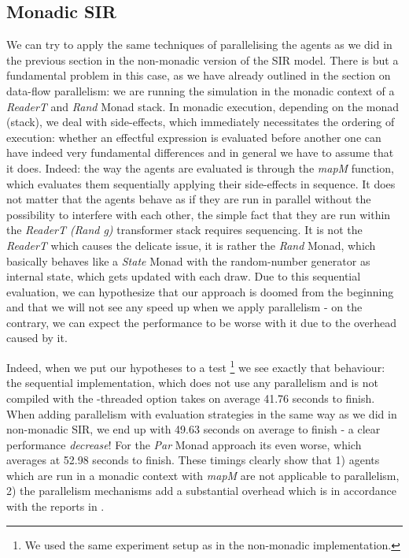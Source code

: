 \subsection{Monadic SIR}
We can try to apply the same techniques of parallelising the agents as we did in the previous section in the non-monadic version of the SIR model. There is but a fundamental problem in this case, as we have already outlined in the section on data-flow parallelism: we are running the simulation in the monadic context of a \textit{ReaderT} and \textit{Rand} Monad stack. In monadic execution, depending on the monad (stack), we deal with side-effects, which immediately necessitates the ordering of execution: whether an effectful expression is evaluated before another one can have indeed very fundamental differences and in general we have to assume that it does.
Indeed: the way the agents are evaluated is through the \textit{mapM} function, which evaluates them sequentially applying their side-effects in sequence. It does not matter that the agents behave as if they are run in parallel without the possibility to interfere with each other, the simple fact that they are run within the \textit{ReaderT (Rand g)} transformer stack requires sequencing. It is not the \textit{ReaderT} which causes the delicate issue, it is rather the \textit{Rand} Monad, which basically behaves like a \textit{State} Monad with the random-number generator as internal state, which gets updated with each draw.
Due to this sequential evaluation, we can hypothesize that our approach is doomed from the beginning and that we will not see any speed up  when we apply parallelism - on the contrary, we can expect the performance to be worse with it due to the overhead caused by it.

Indeed, when we put our hypotheses to a test \footnote{We used the same experiment setup as in the non-monadic implementation.} we see exactly that behaviour: the sequential implementation, which does not use any parallelism and is not compiled with the -threaded option takes on average 41.76 seconds to finish. When adding parallelism with evaluation strategies in the same way as we did in non-monadic SIR, we end up with 49.63 seconds on average to finish - a clear performance \textit{decrease}! For the \textit{Par} Monad approach its even worse, which averages at 52.98 seconds to finish. These timings clearly show that 1) agents which are run in a monadic context with \textit{mapM} are not applicable to parallelism, 2) the parallelism mechanisms add a substantial overhead which is in accordance with the reports in \cite{marlow_parallel_2013}.

